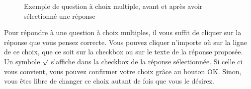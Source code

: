 \documentclass[11pt]{scrreprt}
\begin{document}
\begin{figure}[H]
{        }
        \caption{Exemple de question à choix multiple, avant et après avoir sélectionné une réponse}
    \end{figure}

    Pour répondre à une question à choix multiples, il vous suffit de cliquer sur la réponse que vous pensez correcte. Vous pouvez cliquer n'importe où sur la ligne de ce choix, que ce soit sur la checkbox ou sur le texte de la réponse proposée.\\

    Un symbole $\surd$ s'affiche dans la checkbox de la réponse sélectionnée. Si celle ci vous convient, vous pouvez confirmer votre choix grâce au bouton OK. Sinon, vous êtes libre de changer ce choix autant de fois que vous le désirez.\\
\end{document}
